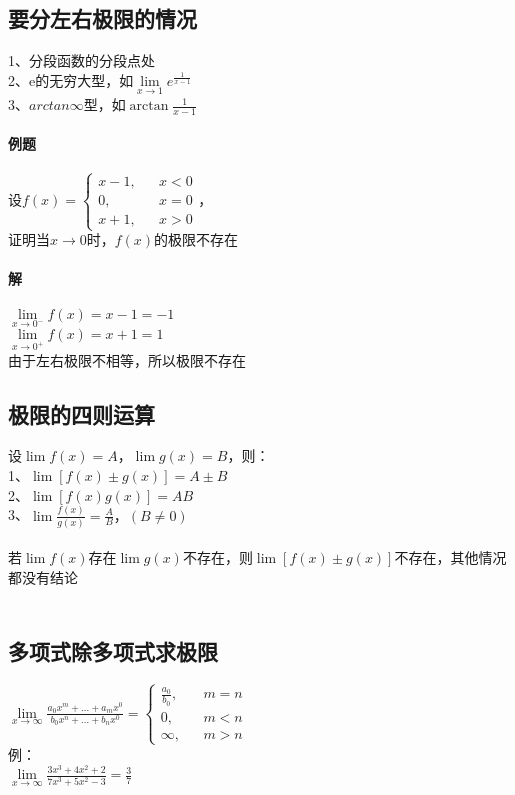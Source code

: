 \documentclass{article}
\begin{document}
\begin{flushleft}
	\subsection{要分左右极限的情况}
	1、分段函数的分段点处\\
	2、e的无穷大型，如$\lim\limits_{x\to 1} e^{\frac{1}{x-1}}$\\
	3、$arctan\infty$型，如$\arctan{\frac{1}{x-1}}$\\
	
	\paragraph{例题}
	设$f(x)=\left\{
	\begin{array}{rcl}
		x-1,& & x<0\\
		0,& & x=0\\
		x+1,& & x>0
	\end{array} \right.$，\\
	证明当$x\to 0$时，$f(x)$的极限不存在
	\paragraph{解}
	$\lim\limits_{x\to 0^-}f(x)=x-1=-1$\\
	$\lim\limits_{x\to 0^+}f(x)=x+1=1$\\
	由于左右极限不相等，所以极限不存在\\
	
	\subsection{极限的四则运算}
	设$\lim f(x)=A，\lim g(x)=B$，则：\\
	1、$\lim [f(x)\pm g(x)]=A\pm B$\\
	2、$\lim [f(x)g(x)]=AB$\\
	3、$\lim \frac{f(x)}{g(x)} =\frac{A}{B}，(B\neq 0)$\\
	~\\
	若$\lim f(x)$存在$\lim g(x)$不存在，则$\lim [f(x)\pm g(x)]$不存在，其他情况都没有结论\\
	~\\
	\subsection{多项式除多项式求极限}
	$\lim\limits_{x\to \infty} \frac{a_0x^m+...+a_mx^0}{b_0x^n+...+b_nx^0}=
	\left\{
	\begin{array}{rcl}
	\frac{a_0}{b_0},& & {m=n}\\
	0,& & {m<n}\\
	\infty,& & {m>n}
	\end{array} \right.$\\
	例：\\
	$\lim\limits_{x\to \infty} \frac{3x^3+4x^2+2}{7x^3+5x^2-3} = \frac{3}{7}$\\
	~\\

\end{flushleft}
\end{document}
